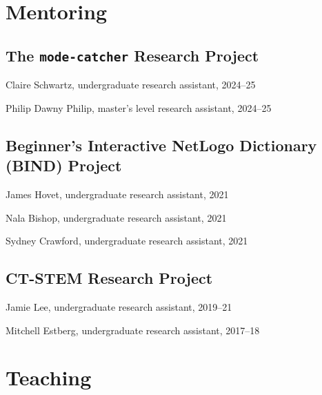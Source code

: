 \documentclass[11pt,letterpaper]{report} %
\newcommand{\listitemspace}{0.25em}
\renewenvironment{itemize}
{\begin{list}{}{\setlength{\leftmargin}{0em}
                \setlength{\parskip}{0em}
                \setlength{\itemsep}{\listitemspace}
                \setlength{\parsep}{\listitemspace}}}
{\end{list}}
\begin{document}


    \section*{Mentoring}

    \subsection*{The \texttt{mode-catcher} Research Project}

    \begin{itemize}
        \item Claire Schwartz, undergraduate research assistant, 2024--25
        \item Philip Dawny Philip, master's level research assistant, 2024--25
    \end{itemize}

    \subsection*{Beginner's Interactive NetLogo Dictionary (BIND) Project}

    \begin{itemize}
        \item James Hovet, undergraduate research assistant, 2021
        \item Nala Bishop, undergraduate research assistant, 2021
        \item Sydney Crawford, undergraduate research assistant, 2021
    \end{itemize}

    \subsection*{CT-STEM Research Project}

    \begin{itemize}
        \item Jamie Lee, undergraduate research assistant, 2019--21
        \item Mitchell Estberg, undergraduate research assistant, 2017--18
    \end{itemize}




    \section*{Teaching}
\end{document}
